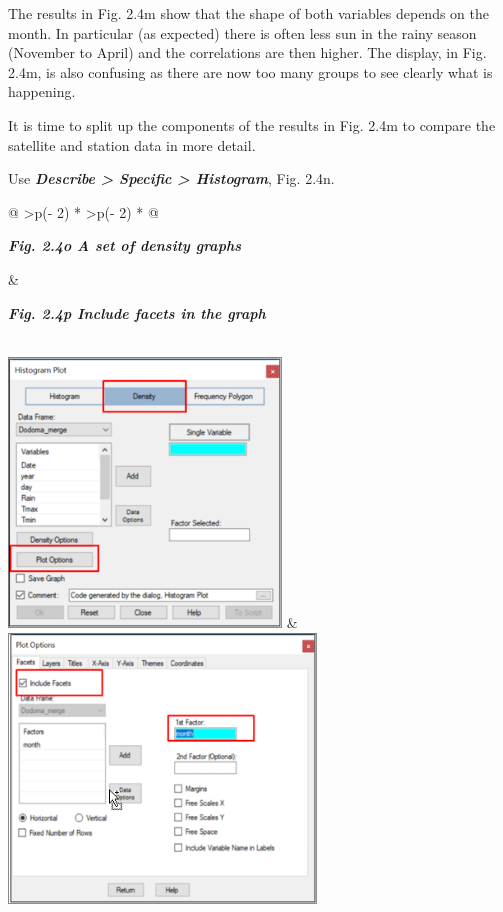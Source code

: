\documentclass[
  letterpaper,
  DIV=11,
  numbers=noendperiod]{scrreprt}
\begin{document}
The results in Fig. 2.4m show that the shape of both variables depends
on the month. In particular (as expected) there is often less sun in the
rainy season (November to April) and the correlations are then higher.
The display, in Fig. 2.4m, is also confusing as there are now too many
groups to see clearly what is happening.

It is time to split up the components of the results in Fig. 2.4m to
compare the satellite and station data in more detail.

Use \textbf{\emph{Describe \textgreater{} Specific \textgreater{}
Histogram}}, Fig. 2.4n.

\begin{longtable}[]{@{}
  >{\centering\arraybackslash}p{(\columnwidth - 2\tabcolsep) * }
  >{\centering\arraybackslash}p{(\columnwidth - 2\tabcolsep) * }@{}}
\toprule\noalign{}
\begin{minipage}[b]{\linewidth}\centering
\textbf{\emph{Fig. 2.4o A set of density graphs}}
\end{minipage} & \begin{minipage}[b]{\linewidth}\centering
\textbf{\emph{Fig. 2.4p Include facets in the graph}}
\end{minipage} \\
\midrule\noalign{}
\endhead
\bottomrule\noalign{}
\endlastfoot
\includegraphics[width=2.856in,height=2.822in]{figures/Fig2.4o.png} &
\includegraphics[width=3.222in,height=2.833in]{figures/Fig2.4p.png} \\
\end{longtable}
\end{document}
